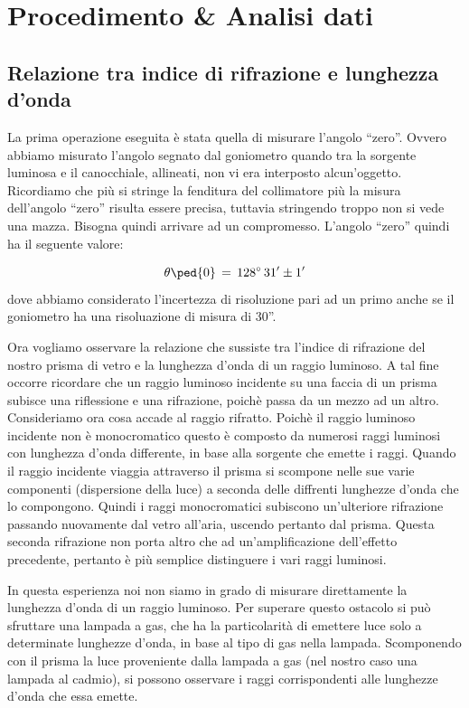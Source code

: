 \section{Procedimento \& Analisi dati}

\subsection{Relazione tra indice di rifrazione e lunghezza d'onda}

La prima operazione eseguita è stata quella di misurare l'angolo ``zero''. Ovvero abbiamo misurato l'angolo segnato dal goniometro quando tra la sorgente luminosa e il canocchiale, allineati, non vi era interposto alcun'oggetto. Ricordiamo che più si stringe la fenditura del collimatore più la misura dell'angolo ``zero'' risulta essere precisa, tuttavia stringendo troppo non si vede una mazza. Bisogna quindi arrivare ad un compromesso.
L'angolo ``zero'' quindi ha il seguente valore:

\begin{equation}
	\theta\ped{0} \,=\, 128^\circ \,31' \pm 1'
\end{equation} 
%
dove abbiamo considerato l'incertezza di risoluzione pari ad un primo anche se il goniometro ha una risoluazione di misura di 30''.

Ora vogliamo osservare la relazione che sussiste tra l'indice di rifrazione del nostro prisma di vetro e la lunghezza d'onda di un raggio luminoso.
A tal fine occorre ricordare che un raggio luminoso incidente su una faccia di un prisma subisce una riflessione e una rifrazione, poichè passa da un mezzo ad un altro.
Consideriamo ora cosa accade al raggio rifratto. Poichè il raggio luminoso incidente non è monocromatico questo è composto da numerosi raggi luminosi con lunghezza d'onda differente, in base alla sorgente che emette i raggi. Quando il raggio incidente viaggia attraverso il prisma si scompone nelle sue varie componenti (dispersione della luce) a seconda delle diffrenti lunghezze d'onda che lo compongono. Quindi i raggi monocromatici subiscono un'ulteriore rifrazione passando nuovamente dal vetro all'aria, uscendo pertanto dal prisma. Questa seconda rifrazione non porta altro che ad un'amplificazione dell'effetto precedente, pertanto è più semplice distinguere i vari raggi luminosi.

In questa esperienza noi non siamo in grado di misurare direttamente la lunghezza d'onda di un raggio luminoso. Per superare questo ostacolo si può sfruttare una lampada a gas, che ha la particolarità di emettere luce solo a determinate lunghezze d'onda, in base al tipo di gas nella lampada. Scomponendo con il prisma la luce proveniente dalla lampada a gas (nel nostro caso una lampada al cadmio), si possono osservare i raggi corrispondenti alle lunghezze d'onda che essa emette.

